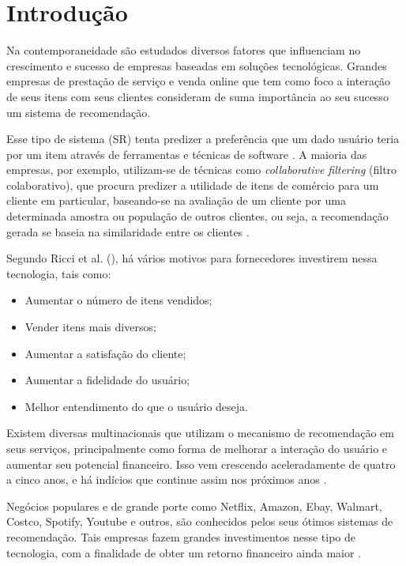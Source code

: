 \chapter{Introdução}

Na contemporaneidade são estudados diversos fatores que influenciam no crescimento e sucesso de empresas baseadas em soluções tecnológicas. Grandes empresas de prestação de serviço e venda online que tem como foco a interação de seus itens com seus clientes consideram de suma importância ao seu sucesso um sistema de recomendação.

Esse tipo de sistema (SR) tenta predizer a preferência que um dado usuário teria por um item através de ferramentas e técnicas de software \cite{souza:2014}. A maioria das empresas, por exemplo, utilizam-se de técnicas como \textit{collaborative filtering} (filtro colaborativo), que procura predizer a utilidade de itens de comércio para um cliente em particular, baseando-se na avaliação de um cliente por uma determinada amostra ou população de outros clientes, ou seja, a recomendação gerada se baseia na similaridade entre os clientes \cite{Linden:2003}.

Segundo Ricci et al. (\citeyear{Ricci:2010}), há vários motivos para fornecedores investirem nessa tecnologia, tais como:

\begin{itemize}
    \item Aumentar o número de itens vendidos;
    \item Vender itens mais diversos;
    \item Aumentar a satisfação do cliente;
    \item Aumentar a fidelidade do usuário;
    \item Melhor entendimento do que o usuário deseja.
\end{itemize}

Existem diversas multinacionais que utilizam o mecanismo de recomendação em seus serviços, principalmente como forma de melhorar a interação do usuário e aumentar seu potencial financeiro. Isso vem crescendo aceleradamente de quatro a cinco anos, e há indícios que continue assim nos próximos anos \cite{Underwood:2017}.

Negócios populares e de grande porte como Netflix, Amazon, Ebay, Walmart, Costco, Spotify, Youtube e outros, são conhecidos pelos seus ótimos sistemas de recomendação. Tais empresas fazem grandes investimentos nesse tipo de tecnologia, com a finalidade de obter um retorno financeiro ainda maior \cite{Underwood:2017}.

